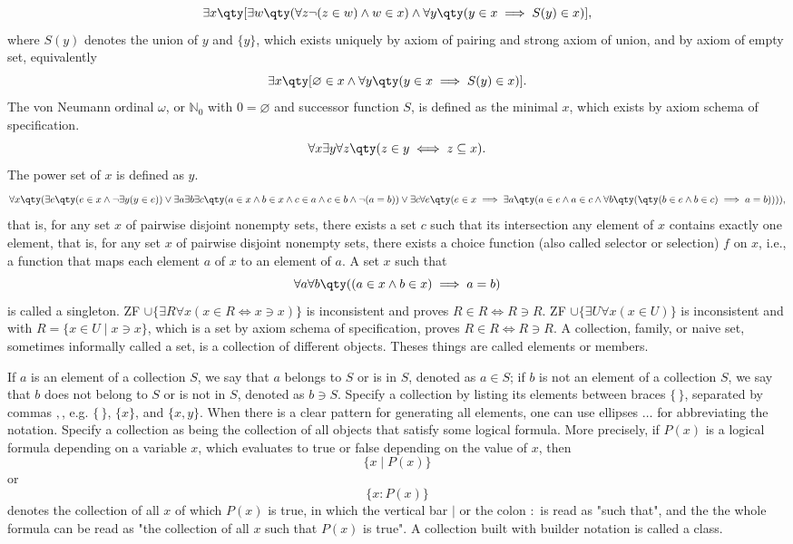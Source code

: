 \documentclass[a4paper,12pt]{article}
\begin{document}
\[\exists x\qty[\exists w\qty(\forall z\neg(z\in w)\land w\in x)\land\forall y\qty(y\in x\implies S(y)\in x)],\]
where $S(y)$ denotes the union of $y$ and $\{y\}$, which exists uniquely by axiom of pairing and strong axiom of union, and by axiom of empty set, equivalently
\[\exists x\qty[\varnothing\in x\land\forall y\qty(y\in x\implies S(y)\in x)].\]
The von Neumann ordinal $\omega$, or $\mathbb{N}_0$ with $0=\varnothing$ and successor function $S$, is defined as the minimal $x$, which exists by axiom schema of specification.
\[\forall x\exists y\forall z\qty(z\in y\iff z\subseteq x).\]
The power set of $x$ is defined as $y$.
\[\forall x\qty(\exists e\qty(e\in x\land\neg\exists y(y\in e))\lor\exists a\exists b\exists c\qty(a\in x\land b\in x\land c\in a\land c\in b\land\neg(a=b))\lor\exists c\forall e\qty(e\in x\implies\exists a\qty(a\in e\land a\in c\land\forall b\qty(\qty(b\in e\land b\in c)\implies a=b)))),\]
that is, for any set $x$ of pairwise disjoint nonempty sets, there exists a set $c$ such that its intersection any element of $x$ contains exactly one element, that is, for any set $x$ of pairwise disjoint nonempty sets, there exists a choice function (also called selector or selection) $f$ on $x$, i.e., a function that maps each element $a$ of $x$ to an element of $a$.
A set $x$ such that
\[\forall a\forall b\qty((a\in x\land b\in x)\implies a=b)\]
is called a singleton.
ZF $\cup\{\exists R\forall x(x\in R\iff x\ni x)\}$ is inconsistent and proves $R\in R\iff R\ni R$.
ZF $\cup\{\exists U\forall x(x\in U)\}$ is inconsistent and with $R=\{x\in U\mid x\ni x\}$, which is a set by axiom schema of specification, proves $R\in R\iff R\ni R$.
A collection, family, or naive set, sometimes informally called a set, is a collection of different objects. Theses things are called elements or members.

If $a$ is an element of a collection $S$, we say that $a$ belongs to $S$ or is in $S$, denoted as $a\in S$; if $b$ is not an element of a collection $S$, we say that $b$ does not belong to $S$ or is not in $S$, denoted as $b\ni S$.
 Specify a collection by listing its elements between braces $\{\,\}$, separated by commas $,$, e.g. $\{\,\}$, $\{x\}$, and $\{x,y\}$. When there is a clear pattern for generating all elements, one can use ellipses $\ldots$ for abbreviating the notation.
Specify a collection as being the collection of all objects that satisfy some logical formula. More precisely, if $P(x)$ is a logical formula depending on a variable ⁠$x$, which evaluates to true or false depending on the value of $x$, then
\[\{x\mid P(x)\}\]
or
\[\{x\colon P(x)\}\]
denotes the collection of all $x$ of which $P(x)$ is true, in which the vertical bar $\mid$ or the colon $\colon$ is read as "such that", and the the whole formula can be read as "the collection of all $x$ such that $P(x)$ is true".
A collection built with builder notation is called a class.
\end{document}

